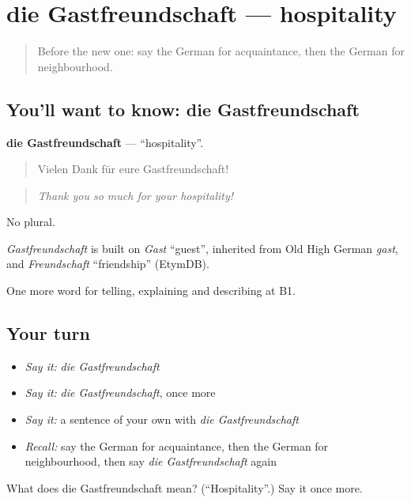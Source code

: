 \section[die Gastfreundschaft]{die Gastfreundschaft — hospitality}

\label{lesson:GE-C498-gastfreundschaft}



\begin{quote}
Before the new one: say the German for acquaintance, then the German for neighbourhood.
\end{quote}

\subsection*{You'll want to know: die Gastfreundschaft}
\textbf{die Gastfreundschaft} — \textquotedblleft{}hospitality\textquotedblright{}.

\begin{quote}
Vielen Dank für eure Gastfreundschaft!
\end{quote}

\begin{quote}
\emph{Thank you so much for your hospitality!}
\end{quote}

No plural.

\begin{cousinweb}
\emph{Gastfreundschaft} is built on \emph{Gast} \textquotedblleft{}guest\textquotedblright{}, inherited from Old High German \emph{gast}, and \emph{Freundschaft} \textquotedblleft{}friendship\textquotedblright{} (EtymDB).
\end{cousinweb}

\begin{grammarlens}[title={What you've built}]
One more word for telling, explaining and describing at B1.
\end{grammarlens}

\subsection*{Your turn}
\begin{itemize}
\raggedright
  \item \emph{Say it:} \emph{die Gastfreundschaft}
  \item \emph{Say it:} \emph{die Gastfreundschaft}, once more
  \item \emph{Say it:} a sentence of your own with \emph{die Gastfreundschaft}
  \item \emph{Recall:} say the German for acquaintance, then the German for neighbourhood, then say \emph{die Gastfreundschaft} again
\end{itemize}

\begin{tcolorbox}[breakable,colback=teal!4,colframe=teal!35!black,title={Before you move on}]
What does die Gastfreundschaft mean? (\textquotedblleft{}Hospitality\textquotedblright{}.) Say it once more.
\end{tcolorbox}
